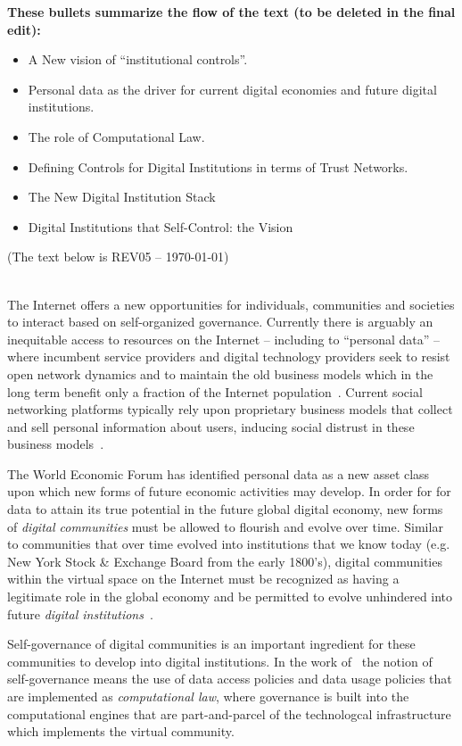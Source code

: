 
{\small
{\bf These bullets summarize the flow of the text (to be deleted in the final edit):
\begin{itemize}
\item  A New vision of ``institutional controls''.
\item  Personal data as the driver for current digital economies and future digital institutions.
\item  The role of Computational Law.
\item  Defining Controls for Digital Institutions in terms of Trust Networks.
\item  The New Digital Institution Stack
\item  Digital Institutions that Self-Control: the Vision
\end{itemize}
(The text below is REV05 -- \today)
}
}
~~\\


The Internet offers a new opportunities for individuals,
communities and societies to interact based on 
self-organized governance.
Currently there is arguably an inequitable access to resources
on the Internet -- including to ``personal data'' -- 
where incumbent service providers
and digital technology providers seek to resist
open network dynamics and to maintain the old business models
which in the long term benefit only a fraction 
of the Internet population~\cite{greene2008reality,pentland2009reality,WEF2011}.
Current social networking platforms typically
rely upon proprietary business models that collect and sell
personal information about users,
inducing social distrust in these business models~\cite{HardjonoDeegan2014}.

The World Economic Forum has identified personal data
as a new asset class~\cite{WEF2011} upon which new forms of future
economic activities may develop.
In order for for data to attain its true potential in the future
global digital economy, new forms of {\em digital communities}
must be allowed to flourish and evolve over time.
Similar to communities that over time evolved into institutions that we know today 
(e.g. New York Stock \& Exchange Board from the early 1800's),
digital communities within the virtual space on the Internet
must be recognized as having a legitimate role in the global economy
and be permitted to evolve unhindered into 
future {\em digital institutions}~\cite{Clippinger2013-InternetDisruption}.

Self-governance of digital communities is an important
ingredient for these communities to develop into
digital institutions. 
In the work of~\cite{Clippinger2013-InternetDisruption}
the notion of self-governance means the use
of data access policies and data usage policies
that are implemented as {\em computational law},
where governance is built into the computational engines
that are part-and-parcel of the technologcal infrastructure
which implements the virtual community.


